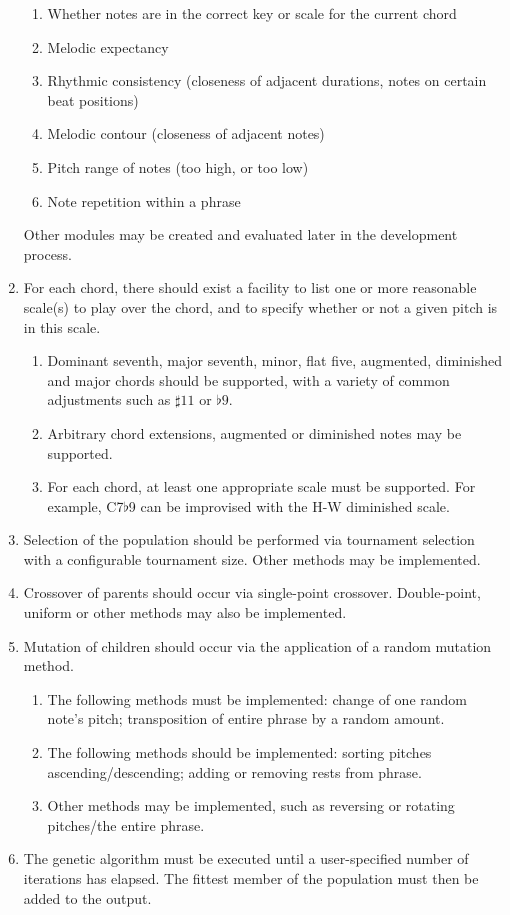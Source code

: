 \begin{enumerate}[resume]
\begin{enumerate}
			\item Whether notes are in the correct key or scale for the current chord
			\item Melodic expectancy
			\item Rhythmic consistency (closeness of adjacent durations, notes on certain beat positions)
			\item Melodic contour (closeness of adjacent notes)
			\item Pitch range of notes (too high, or too low)
			\item Note repetition within a phrase
		\end{enumerate}
		Other modules may be created and evaluated later in the development process.
	\item For each chord, there should exist a facility to list one or more reasonable scale(s) to play over the chord, and to specify whether or not a given pitch is in this scale.
	\begin{enumerate}
		\item Dominant seventh, major seventh, minor, flat five, augmented, diminished and major chords should be supported, with a variety of common adjustments such as $\sharp11$ or $\flat9$.
		\item Arbitrary chord extensions, augmented or diminished notes may be supported.
		\item For each chord, at least one appropriate scale must be supported. For example, C7$\flat$9 can be improvised with the H-W diminished scale.
	\end{enumerate}
	\item Selection of the population should be performed via tournament selection with a configurable tournament size. Other methods may be implemented.
	\item Crossover of parents should occur via single-point crossover. Double-point, uniform or other methods may also be implemented.
	\item Mutation of children should occur via the application of a random mutation method.
	\begin{enumerate}
		\item The following methods must be implemented: change of one random note's pitch; transposition of entire phrase by a random amount.
		\item The following methods should be implemented: sorting pitches ascending/descending; adding or removing rests from phrase.
		\item Other methods may be implemented, such as reversing or rotating pitches/the entire phrase.
	\end{enumerate}
	\item The genetic algorithm must be executed until a user-specified number of iterations has elapsed. The fittest member of the population must then be added to the output.
\end{enumerate}

